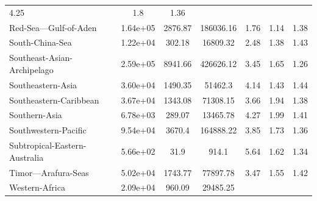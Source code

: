 \begin{table}[H]
{\begin{tabular}{lcccccc}
            4.25                                       & 1.8      & 1.36
            \\
            Red-Sea---Gulf-of-Aden                     & 1.64e+05 & 2876.87 &
            186036.16                                  &
            1.76                                       & 1.14     & 1.38
            \\
            South-China-Sea                            & 1.22e+04 & 302.18  &
            16809.32                                   &
            2.48                                       & 1.38     & 1.43
            \\
            Southeast-Asian-Archipelago                & 2.59e+05 & 8941.66 &
            426626.12                                  &
            3.45                                       & 1.65     & 1.26
            \\
            Southeastern-Asia                          & 3.60e+04 & 1490.35 &
            51462.3                                    &
            4.14                                       & 1.43     & 1.44
            \\
            Southeastern-Caribbean                     & 3.67e+04 & 1343.08 &
            71308.15                                   &
            3.66                                       & 1.94     & 1.38
            \\
            Southern-Asia                              & 6.78e+03 & 289.07  &
            13465.78                                   &
            4.27                                       & 1.99     & 1.41
            \\
            Southwestern-Pacific                       & 9.54e+04 & 3670.4  &
            164888.22                                  &
            3.85                                       & 1.73     & 1.36
            \\
            Subtropical-Eastern-Australia              & 5.66e+02 & 31.9    &
            914.1                                      &
            5.64                                       & 1.62     & 1.34
            \\
            Timor---Arafura-Seas                       & 5.02e+04 & 1743.77 &
            77897.78                                   &
            3.47                                       & 1.55     & 1.42
            \\
            Western-Africa                             & 2.09e+04 & 960.09  &
            29485.25                                   &

\end{tabular}}
\end{table}
